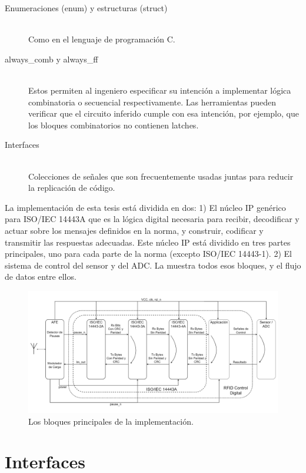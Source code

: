 \documentclass[a4paper, twoside, 11pt]{report}
\begin{document}
\begin{description}
  \item[Enumeraciones (enum) y estructuras (struct)] \hfill \\ Como en el lenguaje de programación C.
  \item[always\_comb y always\_ff] \hfill \\ Estos permiten al ingeniero especificar su intención a implementar lógica combinatoria o secuencial respectivamente. Las herramientas pueden verificar que el circuito inferido cumple con esa intención, por ejemplo, que los bloques combinatorios no contienen latches.
  \item[Interfaces] \hfill \\ Colecciones de señales que son frecuentemente usadas juntas para reducir la replicación de código.
\end{description}

La implementación de esta tesis está dividida en dos: 1) El núcleo IP genérico para ISO/IEC 14443A que es la lógica digital necesaria para recibir, decodificar y actuar sobre los mensajes definidos en la norma, y construir, codificar y transmitir las respuestas adecuadas. Este núcleo IP está dividido en tres partes principales, uno para cada parte de la norma (excepto ISO/IEC 14443-1). 2) El sistema de control del sensor y del ADC. La  muestra todos esos bloques, y el flujo de datos entre ellos.

\begin{figure}[htb]
  \centering
  \includegraphics[width=1.0\textwidth]{./img/top_level}
  \caption{Los bloques principales de la implementación.}
  \label{fig:top_level}
\end{figure}

\FloatBarrier
\section{Interfaces}
\end{document}
